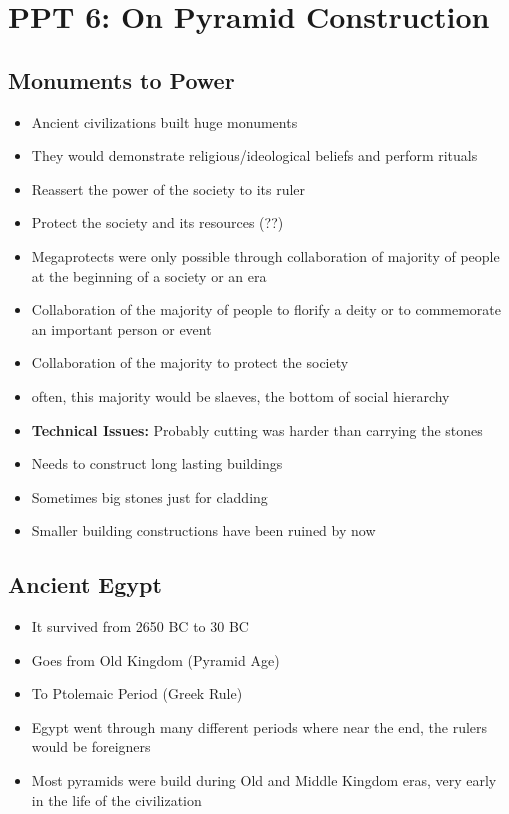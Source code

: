 \documentclass{article}
\begin{document}
\section{PPT 6: On Pyramid Construction}

\subsection{Monuments to Power}
\begin{itemize}
  \item Ancient civilizations built huge monuments
  \item They would demonstrate religious/ideological beliefs and
    perform rituals
  \item Reassert the power of the society to its ruler
  \item Protect the society and its resources (??)
  \item Megaprotects were only possible through
    collaboration of majority of people at the beginning of a society or an era
  \item Collaboration of the majority of people to florify a deity
    or to commemorate an important person or event
  \item Collaboration of the majority to protect the society
  \item often, this majority would be slaeves, the bottom of social hierarchy
  \item \textbf{Technical Issues:}
    Probably cutting was harder than carrying the stones
  \item Needs to construct long lasting buildings
  \item Sometimes big stones just for cladding
  \item Smaller building constructions have been ruined by now
\end{itemize}

\subsection{Ancient Egypt}
\begin{itemize}
  \item It survived from 2650 BC to 30 BC
  \item Goes from Old Kingdom (Pyramid Age)
  \item To Ptolemaic Period (Greek Rule)
  \item Egypt went through many different periods where
    near the end, the rulers would be foreigners
  \item Most pyramids were build during Old and Middle Kingdom eras,
    very early in the life of the civilization
\end{itemize}
\end{document}
